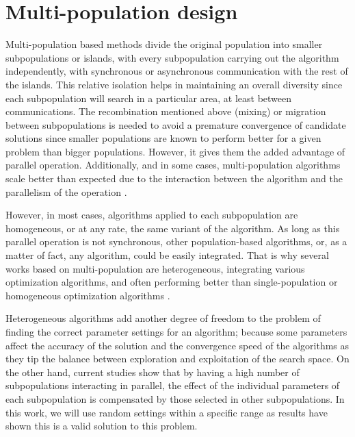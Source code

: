 \documentclass[review]{elsarticle}
\begin{document}
\section{Multi-population design}

Multi-population based methods divide the original population into
smaller subpopulations or islands, with every subpopulation carrying out the
algorithm independently, with synchronous or asynchronous communication with the
rest of the islands. %
This relative isolation helps in maintaining an overall
diversity since each subpopulation will search in a particular area, at least
between communications. The recombination mentioned above (mixing) or migration
between subpopulations is needed to avoid a premature convergence of candidate
solutions since smaller populations are known to perform better for a given
problem than bigger populations. %
However, it gives them the added advantage of
parallel operation. Additionally, and in some cases, multi-population algorithms
scale better than expected due to the interaction between the algorithm and the
parallelism of the operation \cite{ALBA20027}. %

However, in most cases, algorithms applied to each subpopulation are
homogeneous, or at any rate, the same variant of the algorithm. As long as this
parallel operation is not synchronous, other population-based algorithms, or, as
a matter of fact, any algorithm, could be easily integrated. That is why several
works based on multi-population are heterogeneous, integrating various
optimization algorithms, and often performing better than single-population or
homogeneous optimization algorithms \cite{wu2016differential,nseef2016adaptive}.

Heterogeneous algorithms add another degree of freedom to the problem of finding
the correct parameter settings for an algorithm; because some parameters affect
the accuracy of the solution and the convergence speed of the algorithms as they
tip the balance between exploration and exploitation of the search space. On the
other hand, current studies show that by having a high number of subpopulations
interacting in parallel, the effect of the individual parameters of each
subpopulation is compensated by those selected in other subpopulations. In this
work, we will use random settings within a specific range as results have shown
this is a valid solution to this problem. 
\end{document}
